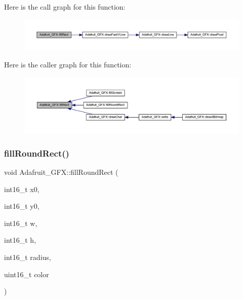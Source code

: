 Here is the call graph for this function\+:\nopagebreak
\begin{figure}[H]
\begin{center}
\leavevmode
\includegraphics[width=350pt]{class_adafruit___g_f_x_aa43cf1dfe6c17d040a0f1fd5ffbe9d69_cgraph}
\end{center}
\end{figure}
Here is the caller graph for this function\+:\nopagebreak
\begin{figure}[H]
\begin{center}
\leavevmode
\includegraphics[width=350pt]{class_adafruit___g_f_x_aa43cf1dfe6c17d040a0f1fd5ffbe9d69_icgraph}
\end{center}
\end{figure}
\mbox{\label{class_adafruit___g_f_x_a78dc59f6a508bcd3d5ac7af957b8b1ac}} 
\subsubsection{\texorpdfstring{fill\+Round\+Rect()}{fillRoundRect()}}
{\footnotesize\ttfamily void Adafruit\+\_\+\+G\+F\+X\+::fill\+Round\+Rect (\begin{DoxyParamCaption}\item[{int16\+\_\+t}]{x0,  }\item[{int16\+\_\+t}]{y0,  }\item[{int16\+\_\+t}]{w,  }\item[{int16\+\_\+t}]{h,  }\item[{int16\+\_\+t}]{radius,  }\item[{uint16\+\_\+t}]{color }\end{DoxyParamCaption})}


